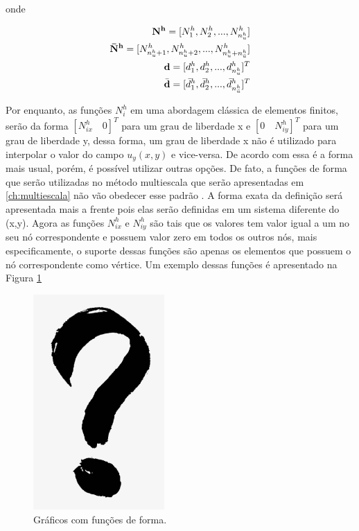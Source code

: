 onde 

\begin{eqnarray*}
\mathbf{N^h} = [N^h_1, N^h_2, ..., N^h_{n_u^h} ] \\
\mathbf{\bar{N}^h}  =[N^h_{n_u^h + 1}, N^h_{n_u^h + 2}, ..., N^h_{n_u^h + n_{\bar{u}}^h}] \\
\mathbf{d} = [d_1^h, d_2^h, ... , d_{n_u^h}^h]^T \\
\bar{\mathbf{d}} = [\bar{d}_1^h, \bar{d}_2^h, ... , \bar{d}_{n_{\bar{u}}^h}^h]^T
\end{eqnarray*}



Por enquanto, as funções $N^h_i$ em uma abordagem clássica de elementos finitos, serão da forma $[N^h_{ix} \quad 0]^T$ para um grau de liberdade x e  $[0 \quad N^h_{iy}]^T$  para um grau de liberdade y, dessa forma, um grau de liberdade x não é utilizado para interpolar o valor do campo $u_y(x, y)$ e vice-versa. De acordo com \cite{jacob} essa é a forma mais usual, porém, é possível utilizar outras opções. De fato, a funções de forma que serão utilizadas no método multiescala que serão apresentadas em \ref{ch:multiescala} não vão obedecer esse padrão . A forma exata da definição será apresentada mais a frente pois elas serão definidas em um sistema diferente do (x,y). Agora as funções $N^h_{ix}$ e $N^h_{iy}$ são tais que os valores tem valor igual a um no seu nó correspondente e possuem valor zero em todos os outros nós, mais especificamente, o suporte dessas funções são apenas os elementos que possuem o nó correspondente como vértice. Um exemplo dessas funções é apresentado na Figura \ref{fig:shapefunctions}

\begin{figure}[!htbp]
\centering
\includegraphics[width=5cm]{interrogacao.png}
\caption{Gráficos com funções de forma.}
\label{fig:shapefunctions}
\end{figure}

